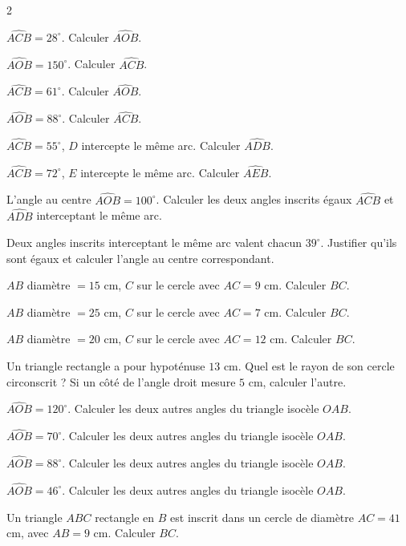 \begin{multicols}{2}

\exo{} $\widehat{ACB}=28^{\circ}$. Calculer $\widehat{AOB}$.

\exo{} $\widehat{AOB}=150^{\circ}$. Calculer $\widehat{ACB}$.

\exo{} $\widehat{ACB}=61^{\circ}$. Calculer $\widehat{AOB}$.

\exo{} $\widehat{AOB}=88^{\circ}$. Calculer $\widehat{ACB}$.

\exo{} $\widehat{ACB}=55^{\circ}$, $D$ intercepte le même arc. Calculer
$\widehat{ADB}$.

\exo{} $\widehat{ACB}=72^{\circ}$, $E$ intercepte le même arc. Calculer
$\widehat{AEB}$.

\exo{} L'angle au centre $\widehat{AOB}=100^{\circ}$. Calculer les deux angles
inscrits égaux $\widehat{ACB}$ et $\widehat{ADB}$ interceptant le même arc.

\exo{} Deux angles inscrits interceptant le même arc valent chacun $39^{\circ}$.
Justifier qu'ils sont égaux et calculer l'angle au centre correspondant.

\exo{} $AB$ diamètre $=15$ cm, $C$ sur le cercle avec $AC=9$ cm. Calculer $BC$.

\exo{} $AB$ diamètre $=25$ cm, $C$ sur le cercle avec $AC=7$ cm. Calculer $BC$.

\exo{} $AB$ diamètre $=20$ cm, $C$ sur le cercle avec $AC=12$ cm. Calculer $BC$.

\exo{} Un triangle rectangle a pour hypoténuse $13$ cm. Quel est le rayon de son
cercle circonscrit ? Si un côté de l'angle droit mesure $5$ cm, calculer l'autre.

\exo{} $\widehat{AOB}=120^{\circ}$. Calculer les deux autres angles du triangle
isocèle $OAB$.

\exo{} $\widehat{AOB}=70^{\circ}$. Calculer les deux autres angles du triangle
isocèle $OAB$.

\exo{} $\widehat{AOB}=88^{\circ}$. Calculer les deux autres angles du triangle
isocèle $OAB$.

\exo{} $\widehat{AOB}=46^{\circ}$. Calculer les deux autres angles du triangle
isocèle $OAB$.

\exo{} Un triangle $ABC$ rectangle en $B$ est inscrit dans un cercle de diamètre
$AC=41$ cm, avec $AB=9$ cm. Calculer $BC$.


\end{multicols}
